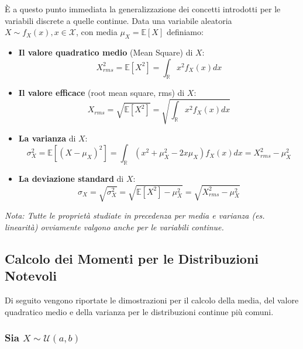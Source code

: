 È a questo punto immediata la generalizzazione dei concetti introdotti per le variabili discrete a quelle continue. Data una variabile aleatoria $X \sim f_X(x), x \in \mathcal{X}$, con media $\mu_X = \mathbb{E}[X]$ definiamo:

\begin{itemize}
    \item \textbf{Il valore quadratico medio} (Mean Square) di $X$:
    \begin{equation}
    X_{rms}^2 = \mathbb{E}[X^2] = \int_{\mathbb{R}} x^2 f_X(x) dx
    \end{equation}
    
    \item \textbf{Il valore efficace} (root mean square, rms) di $X$:
    \begin{equation}
    X_{rms} = \sqrt{\mathbb{E}[X^2]} = \sqrt{\int_{\mathbb{R}} x^2 f_X(x) dx}
    \end{equation}
    
    \item \textbf{La varianza} di $X$:
    \begin{equation}
    \sigma_X^2 = \mathbb{E}[(X - \mu_X)^2] = \int_{\mathbb{R}} (x^2 + \mu_X^2 - 2x\mu_X) f_X(x) dx = X_{rms}^2 - \mu_X^2
    \end{equation}
    
    \item \textbf{La deviazione standard} di $X$:
    \begin{equation}
    \sigma_X = \sqrt{\sigma_X^2} = \sqrt{\mathbb{E}[X^2] - \mu_X^2} = \sqrt{X_{rms}^2 - \mu_X^2}
    \end{equation}
\end{itemize}

\textit{Nota: Tutte le proprietà studiate in precedenza per media e varianza (es. linearità) ovviamente valgono anche per le variabili continue.}

\subsection{Calcolo dei Momenti per le Distribuzioni Notevoli}

Di seguito vengono riportate le dimostrazioni per il calcolo della media, del valore quadratico medio e della varianza per le distribuzioni continue più comuni.

\subsubsection{Sia $X \sim \mathcal{U}(a, b)$}


